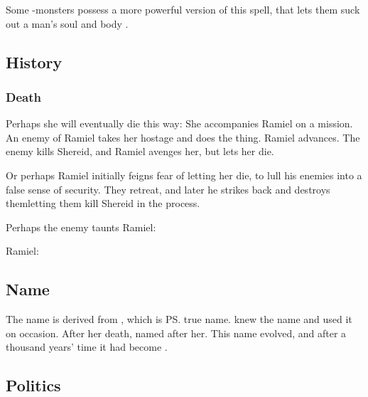 \index{\succubus}%
Some -monsters possess a more powerful version of this spell, that lets them suck out a man's soul and body . 









\subsection{History}
\subsubsection{Death}
Perhaps she will eventually die this way: She accompanies Ramiel on a mission. An enemy of Ramiel takes her hostage and does the  thing. Ramiel advances. The enemy kills Shereid, and Ramiel avenges her, but lets her die. 

Or perhaps Ramiel initially feigns fear of letting her die, to lull his enemies into a false sense of security. They retreat, and later he strikes back and destroys them\dash letting them kill Shereid in the process. 

Perhaps the enemy taunts Ramiel: 

Ramiel: 









\subsection{Name}
The name  is derived from , which is \ps{} true name. 
\Belzir{} knew the name and used it on occasion. 
After her death,  named  \Shiaraid{} after her. 
This name evolved, and after a thousand years' time it had become . 









\subsection{Politics}
